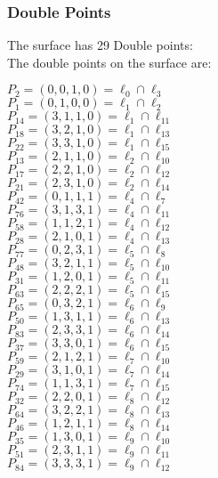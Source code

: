 \documentclass{article}
\begin{document}
{\subsubsection*{Double Points}
The surface has 29 Double points:\\
The double points on the surface are:\\
\begin{multicols}{2}
\noindent
$P_{2} = ( 0, 0, 1, 0 ) = \ell_{0} \cap \ell_{3} $\\
$P_{1} = ( 0, 1, 0, 0 ) = \ell_{1} \cap \ell_{2} $\\
$P_{14} = ( 3, 1, 1, 0 ) = \ell_{1} \cap \ell_{11} $\\
$P_{18} = ( 3, 2, 1, 0 ) = \ell_{1} \cap \ell_{13} $\\
$P_{22} = ( 3, 3, 1, 0 ) = \ell_{1} \cap \ell_{15} $\\
$P_{13} = ( 2, 1, 1, 0 ) = \ell_{2} \cap \ell_{10} $\\
$P_{17} = ( 2, 2, 1, 0 ) = \ell_{2} \cap \ell_{12} $\\
$P_{21} = ( 2, 3, 1, 0 ) = \ell_{2} \cap \ell_{14} $\\
$P_{42} = ( 0, 1, 1, 1 ) = \ell_{4} \cap \ell_{7} $\\
$P_{76} = ( 3, 1, 3, 1 ) = \ell_{4} \cap \ell_{11} $\\
$P_{58} = ( 1, 1, 2, 1 ) = \ell_{4} \cap \ell_{12} $\\
$P_{28} = ( 2, 1, 0, 1 ) = \ell_{4} \cap \ell_{13} $\\
$P_{77} = ( 0, 2, 3, 1 ) = \ell_{5} \cap \ell_{8} $\\
$P_{48} = ( 3, 2, 1, 1 ) = \ell_{5} \cap \ell_{10} $\\
$P_{31} = ( 1, 2, 0, 1 ) = \ell_{5} \cap \ell_{11} $\\
$P_{63} = ( 2, 2, 2, 1 ) = \ell_{5} \cap \ell_{15} $\\
$P_{65} = ( 0, 3, 2, 1 ) = \ell_{6} \cap \ell_{9} $\\
$P_{50} = ( 1, 3, 1, 1 ) = \ell_{6} \cap \ell_{13} $\\
$P_{83} = ( 2, 3, 3, 1 ) = \ell_{6} \cap \ell_{14} $\\
$P_{37} = ( 3, 3, 0, 1 ) = \ell_{6} \cap \ell_{15} $\\
$P_{59} = ( 2, 1, 2, 1 ) = \ell_{7} \cap \ell_{10} $\\
$P_{29} = ( 3, 1, 0, 1 ) = \ell_{7} \cap \ell_{14} $\\
$P_{74} = ( 1, 1, 3, 1 ) = \ell_{7} \cap \ell_{15} $\\
$P_{32} = ( 2, 2, 0, 1 ) = \ell_{8} \cap \ell_{12} $\\
$P_{64} = ( 3, 2, 2, 1 ) = \ell_{8} \cap \ell_{13} $\\
$P_{46} = ( 1, 2, 1, 1 ) = \ell_{8} \cap \ell_{14} $\\
$P_{35} = ( 1, 3, 0, 1 ) = \ell_{9} \cap \ell_{10} $\\
$P_{51} = ( 2, 3, 1, 1 ) = \ell_{9} \cap \ell_{11} $\\
$P_{84} = ( 3, 3, 3, 1 ) = \ell_{9} \cap \ell_{12} $\\
\end{multicols}
}
\end{document}

